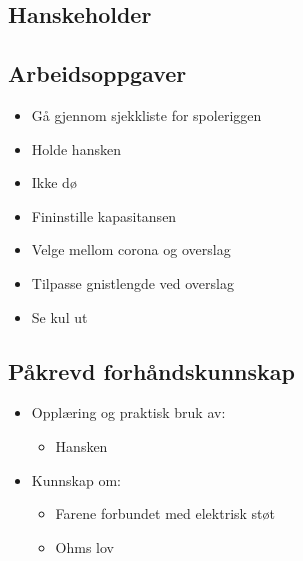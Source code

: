 \subsection{Hanskeholder}

\subsection*{Arbeidsoppgaver}
\begin{itemize}
\item{Gå gjennom sjekkliste for spoleriggen}
\item{Holde hansken}
\item{Ikke dø}
\item{Fininstille kapasitansen}
\item{Velge mellom corona og overslag}
\item{Tilpasse gnistlengde ved overslag}
\item{Se kul ut}
\end{itemize}


\subsection*{Påkrevd forhåndskunnskap}
\begin{itemize}
\item{Opplæring og praktisk bruk av:}
\begin{itemize}
\item{Hansken}
\end{itemize}
\item{Kunnskap om:}
\begin{itemize}
\item{Farene forbundet med elektrisk støt}
\item{Ohms lov}
\end{itemize}
\end{itemize}